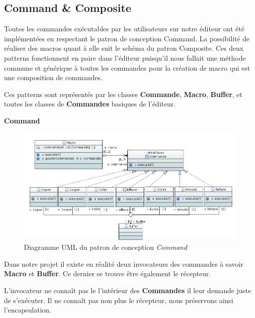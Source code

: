 \documentclass[a4paper,11pt]{article}
\begin{document}
%
%

\subsection{Command \& Composite}\label{subsec:com&com}
Toutes les commandes exécutables par les utilisateurs sur notre éditeur ont été implémentées en respectant le patron de conception Command. La possibilité de réaliser des macros quant à elle suit le schéma du patron Composite. Ces deux patterns fonctionnent en paire dans l'éditeur puisqu'il nous fallait une méthode commune et générique à toutes les commandes pour la création de macro qui est une composition de commandes.
\smallskip

\noindent Ces patterns sont représentés par les classes \textbf{Commande}, \textbf{Macro}, \textbf{Buffer}, et toutes les classes de \textbf{Commandes} basiques de l'éditeur.

\vspace{2cm}
\large{\textbf{Command}}

\begin{figure}[h!]
   \centerline{\includegraphics[scale=0.7]{DiagrammeCommand.png}}
   \caption{\label{diaCommand} Diagramme UML du patron de conception \emph{Command}}
\end{figure}

\vspace{2cm}
\noindent Dans notre projet il existe en réalité deux invocateurs des commandes à savoir \textbf{Macro} et \textbf{Buffer}. Ce dernier se trouve être également le récepteur.
\smallskip

\noindent L'invocateur ne connaît pas le l'intérieur des \textbf{Commandes} il leur demande juste de s'exécuter. Il ne connaît pas non plus le récepteur, nous préservons ainsi l'encapsulation.
\end{document}
